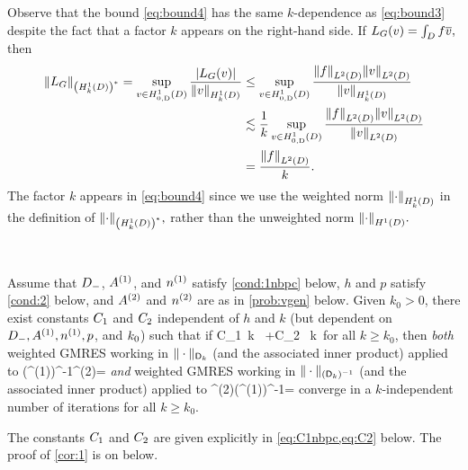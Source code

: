 \label{rem:yesitis}
Observe that the bound \cref{eq:bound4} has the same $k$-dependence as \cref{eq:bound3} despite the fact that a factor $k$ appears on the right-hand side. If $L_{G}(v) = \int_{D} f\overline{v},$ then
\begin{align*}
  \NHokDs{\LG} = \sup_{v \in \HozDD} \frac{\abs{\LG(v)}}{\NHokD{v}} &\leq\sup_{v \in \HozDD} \frac{\NLtD{f}\NLtD{v}}{\NHokD{v}}\\
  &\lesssim \frac1k \sup_{v \in \HozDD} \frac{\NLtD{f}\NLtD{v}}{\NLtD{v}}\\
  &= \frac{\NLtD{f}}k.
\end{align*}
The factor $k$ appears in \cref{eq:bound4} since we use the weighted norm $\NHokD{\cdot}$ in the definition of $\NHokDs{\cdot},$ rather than the unweighted norm $\NHoD{\cdot}.$
\ere

\label{cor:1}

\

\noindent Assume that $D_{-}$, ${A}^{(1)}$, and ${n}^{(1)}$ satisfy \cref{cond:1nbpc} below, $h$ and $p$ satisfy \cref{cond:2} below, and ${A}^{(2)}$ and ${n}^{(2)}$ are as in \cref{prob:vgen} below. Given $k_0>0$, there exist constants $C_{1}$ and $C_{2}$  independent of $h$ and $k$ (but dependent on $D_{-}, {A}^{(1)}, {n}^{(1)}, p$, and $k_{0}$) such that if 
\beq\label{eq:cond}
C_1 \,k \,\NLiDop{\Aso-\Ast} +C_2 \, k\, \NLiDRR{\nso-\nst}
\leq {}
\eeq
for all $k\geq k_0$, then \emph{both} weighted GMRES working in $\|\cdot\|_{\mathsf{D}_k}$ (and the associated inner product) applied to 
\beq\label{eq:pcsystem1}
(\Amat^{(1)})^{-1}\Amat^{(2)}\uvec = \fvec
\eeq
\emph{and} weighted GMRES working in $\|\cdot\|_{(\mathsf{D}_k)^{-1}}$ (and the associated inner product) applied to 
\beq\label{eq:pcsystem2}
\Amat^{(2)}(\Amat^{(1)})^{-1}\vvec = \fvec
\eeq
 converge in a $k$-independent number of iterations for all $k\geq k_0$.
 \enth

The constants $C_{1}$ and $C_{2}$ are given explicitly  in \cref{eq:C1nbpc,eq:C2} below. The proof of \cref{cor:1} is on  below.

\label{cor:1a}

\

